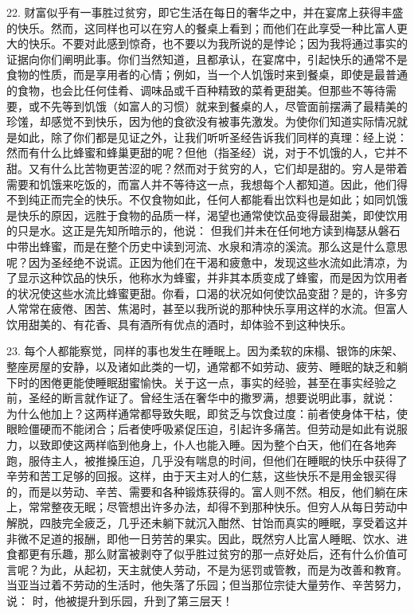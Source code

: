 22. 财富似乎有一事胜过贫穷，即它生活在每日的奢华之中，并在宴席上获得丰盛的快乐。然而，这同样也可以在穷人的餐桌上看到；而他们在此享受一种比富人更大的快乐。不要对此感到惊奇，也不要以为我所说的是悖论；因为我将通过事实的证据向你们阐明此事。你们当然知道，且都承认，在宴席中，引起快乐的通常不是食物的性质，而是享用者的心情；例如，当一个人饥饿时来到餐桌，即使是最普通的食物，也会比任何佳肴、调味品或千百种精致的菜肴更甜美。但那些不等待需要，或不先等到饥饿（如富人的习惯）就来到餐桌的人，尽管面前摆满了最精美的珍馐，却感觉不到快乐，因为他的食欲没有被事先激发。为使你们知道实际情况就是如此，除了你们都是见证之外，让我们听听圣经告诉我们同样的真理：经上说： 然而有什么比蜂蜜和蜂巢更甜的呢？但他（指圣经）说，对于不饥饿的人，它并不甜。又有什么比苦物更苦涩的呢？然而对于贫穷的人，它们却是甜的。穷人是带着需要和饥饿来吃饭的，而富人并不等待这一点，我想每个人都知道。因此，他们得不到纯正而完全的快乐。不仅食物如此，任何人都能看出饮料也是如此；如同饥饿是快乐的原因，远胜于食物的品质一样，渴望也通常使饮品变得最甜美，即使饮用的只是水。这正是先知所暗示的，他说： 但我们并未在任何地方读到梅瑟从磐石中带出蜂蜜，而是在整个历史中读到河流、水泉和清凉的溪流。那么这是什么意思呢？因为圣经绝不说谎。正因为他们在干渴和疲惫中，发现这些水流如此清凉，为了显示这种饮品的快乐，他称水为蜂蜜，并非其本质变成了蜂蜜，而是因为饮用者的状况使这些水流比蜂蜜更甜。你看，口渴的状况如何使饮品变甜？是的，许多穷人常常在疲倦、困苦、焦渴时，甚至以我所说的那种快乐享用这样的水流。但富人饮用甜美的、有花香、具有酒所有优点的酒时，却体验不到这种快乐。\par

23. 每个人都能察觉，同样的事也发生在睡眠上。因为柔软的床榻、银饰的床架、整座房屋的安静，以及诸如此类的一切，通常都不如劳动、疲劳、睡眠的缺乏和躺下时的困倦更能使睡眠甜蜜愉快。关于这一点，事实的经验，甚至在事实经验之前，圣经的断言就作证了。曾经生活在奢华中的撒罗满，想要说明此事，就说： 为什么他加上？这两样通常都导致失眠，即贫乏与饮食过度：前者使身体干枯，使眼睑僵硬而不能闭合；后者使呼吸紧促压迫，引起许多痛苦。但劳动是如此有说服力，以致即使这两样临到他身上，仆人也能入睡。因为整个白天，他们在各地奔跑，服侍主人，被推搡压迫，几乎没有喘息的时间，但他们在睡眠的快乐中获得了辛劳和苦工足够的回报。这样，由于天主对人的仁慈，这些快乐不是用金银买得的，而是以劳动、辛苦、需要和各种锻炼获得的。富人则不然。相反，他们躺在床上，常常整夜无眠；尽管想出许多办法，却得不到那种快乐。但穷人从每日劳动中解脱，四肢完全疲乏，几乎还未躺下就沉入酣然、甘饴而真实的睡眠，享受着这并非微不足道的报酬，即他一日劳苦的果实。因此，既然穷人比富人睡眠、饮水、进食都更有乐趣，那么财富被剥夺了似乎胜过贫穷的那一点好处后，还有什么价值可言呢？为此，从起初，天主就使人劳动，不是为惩罚或管教，而是为改善和教育。当亚当过着不劳动的生活时，他失落了乐园；但当那位宗徒大量劳作、辛苦努力，说： 时，他被提升到乐园，升到了第三层天！\par

